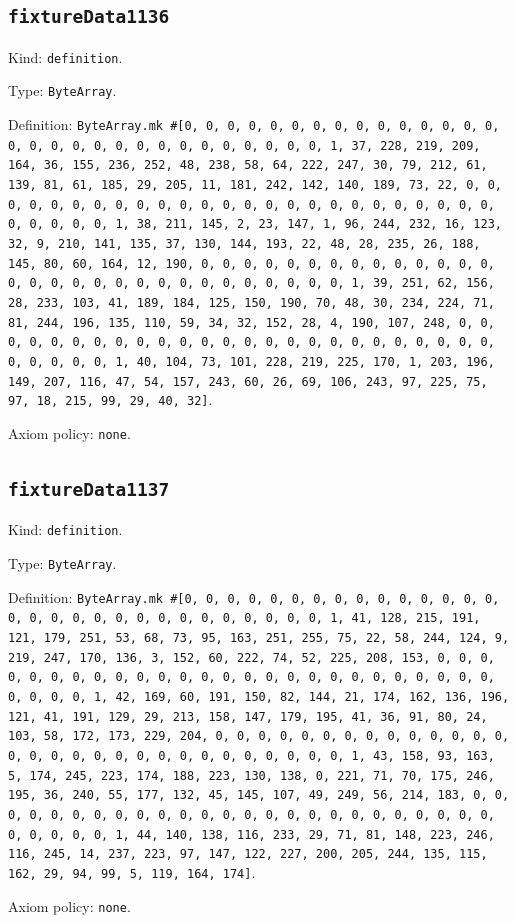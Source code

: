 \documentclass[11pt]{article}
\begin{document}
\subsection*{\texttt{fixtureData1136}}
\noindent Kind: \texttt{definition}.\par
\noindent Type: \texttt{ByteArray}.\par
\noindent Definition: \texttt{ByteArray.mk \#[0, 0, 0, 0, 0, 0, 0, 0, 0, 0, 0, 0, 0, 0, 0, 0, 0, 0, 0, 0, 0, 0, 0, 0, 0, 0, 0, 0, 0, 0, 1, 37, 228, 219, 209, 164, 36, 155, 236, 252, 48, 238, 58, 64, 222, 247, 30, 79, 212, 61, 139, 81, 61, 185, 29, 205, 11, 181, 242, 142, 140, 189, 73, 22, 0, 0, 0, 0, 0, 0, 0, 0, 0, 0, 0, 0, 0, 0, 0, 0, 0, 0, 0, 0, 0, 0, 0, 0, 0, 0, 0, 0, 0, 0, 1, 38, 211, 145, 2, 23, 147, 1, 96, 244, 232, 16, 123, 32, 9, 210, 141, 135, 37, 130, 144, 193, 22, 48, 28, 235, 26, 188, 145, 80, 60, 164, 12, 190, 0, 0, 0, 0, 0, 0, 0, 0, 0, 0, 0, 0, 0, 0, 0, 0, 0, 0, 0, 0, 0, 0, 0, 0, 0, 0, 0, 0, 0, 0, 1, 39, 251, 62, 156, 28, 233, 103, 41, 189, 184, 125, 150, 190, 70, 48, 30, 234, 224, 71, 81, 244, 196, 135, 110, 59, 34, 32, 152, 28, 4, 190, 107, 248, 0, 0, 0, 0, 0, 0, 0, 0, 0, 0, 0, 0, 0, 0, 0, 0, 0, 0, 0, 0, 0, 0, 0, 0, 0, 0, 0, 0, 0, 0, 1, 40, 104, 73, 101, 228, 219, 225, 170, 1, 203, 196, 149, 207, 116, 47, 54, 157, 243, 60, 26, 69, 106, 243, 97, 225, 75, 97, 18, 215, 99, 29, 40, 32]}.\par
\noindent Axiom policy: \texttt{none}.\par
\subsection*{\texttt{fixtureData1137}}
\noindent Kind: \texttt{definition}.\par
\noindent Type: \texttt{ByteArray}.\par
\noindent Definition: \texttt{ByteArray.mk \#[0, 0, 0, 0, 0, 0, 0, 0, 0, 0, 0, 0, 0, 0, 0, 0, 0, 0, 0, 0, 0, 0, 0, 0, 0, 0, 0, 0, 0, 0, 1, 41, 128, 215, 191, 121, 179, 251, 53, 68, 73, 95, 163, 251, 255, 75, 22, 58, 244, 124, 9, 219, 247, 170, 136, 3, 152, 60, 222, 74, 52, 225, 208, 153, 0, 0, 0, 0, 0, 0, 0, 0, 0, 0, 0, 0, 0, 0, 0, 0, 0, 0, 0, 0, 0, 0, 0, 0, 0, 0, 0, 0, 0, 0, 1, 42, 169, 60, 191, 150, 82, 144, 21, 174, 162, 136, 196, 121, 41, 191, 129, 29, 213, 158, 147, 179, 195, 41, 36, 91, 80, 24, 103, 58, 172, 173, 229, 204, 0, 0, 0, 0, 0, 0, 0, 0, 0, 0, 0, 0, 0, 0, 0, 0, 0, 0, 0, 0, 0, 0, 0, 0, 0, 0, 0, 0, 0, 0, 1, 43, 158, 93, 163, 5, 174, 245, 223, 174, 188, 223, 130, 138, 0, 221, 71, 70, 175, 246, 195, 36, 240, 55, 177, 132, 45, 145, 107, 49, 249, 56, 214, 183, 0, 0, 0, 0, 0, 0, 0, 0, 0, 0, 0, 0, 0, 0, 0, 0, 0, 0, 0, 0, 0, 0, 0, 0, 0, 0, 0, 0, 0, 0, 1, 44, 140, 138, 116, 233, 29, 71, 81, 148, 223, 246, 116, 245, 14, 237, 223, 97, 147, 122, 227, 200, 205, 244, 135, 115, 162, 29, 94, 99, 5, 119, 164, 174]}.\par
\noindent Axiom policy: \texttt{none}.\par
\end{document}
